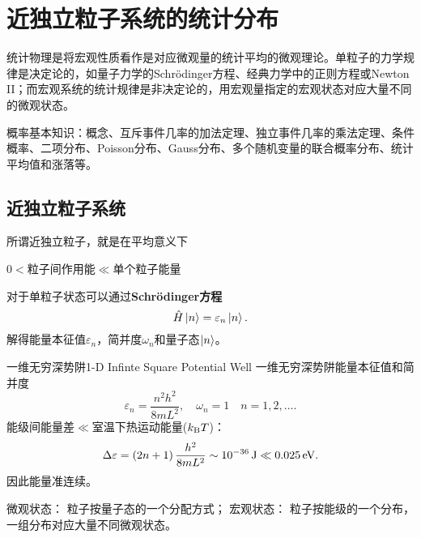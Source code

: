 \chapter{近独立粒子系统的统计分布}
统计物理是将宏观性质看作是对应微观量的统计平均的微观理论。单粒子的力学规律是决定论的，如量子力学的Schrödinger方程、经典力学中的正则方程或Newton II；而宏观系统的统计规律是非决定论的，用宏观量指定的宏观状态对应大量不同的微观状态。

概率基本知识：概念、互斥事件几率的加法定理、独立事件几率的乘法定理、条件概率、二项分布、Poisson分布、Gauss分布、多个随机变量的联合概率分布、统计平均值和涨落等。

\section{近独立粒子系统}

所谓近独立粒子，就是在平均意义下
\begin{center}
	$0<$粒子间作用能$\ll$单个粒子能量
\end{center}
对于单粒子状态可以通过\textbf{Schrödinger方程}
\[
	\hat H\left\vert n\right\rangle=\varepsilon_n\left\vert n\right\rangle.
\]
解得能量本征值$\varepsilon_n$，简并度$\omega_n$和量子态$\left\vert n\right\rangle$。
\begin{example}{一维无穷深势阱}{1-D Infinte Square Potential Well}
	一维无穷深势阱能量本征值和简并度
	\[
		\varepsilon_n=\frac{n^2h^2}{8mL^2},\quad\omega_n=1\quad n=1,2,\ldots.
	\]
	能级间能量差$\ll$室温下热运动能量($k_{\mathrm B} T$)：
	\[
		\Delta\varepsilon=\left(2n+1\right)\frac{h^2}{8mL^2}\sim\SI{e-36}\joule\ll\SI{0.025}\electronvolt.
	\]
	因此能量准连续。
\end{example}
微观状态：
粒子按量子态的一个分配方式；
宏观状态：
粒子按能级的一个分布，%
一组分布对应大量不同微观状态。


